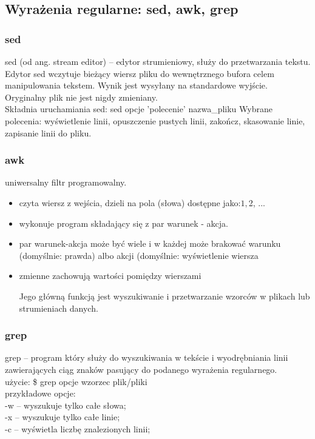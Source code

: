 \documentclass[a4paper,twoside]{report}
\begin{document}
\subsection{Wyrażenia regularne: sed, awk, grep} 

\subsubsection{sed}

sed (od ang. stream editor) – edytor strumieniowy, służy do przetwarzania tekstu.
Edytor sed
wczytuje   bieżący   wiersz   pliku   do   wewnętrznego   bufora   celem
manipulowania   tekstem.   Wynik   jest   wysyłany   na   standardowe   wyjście.
Oryginalny plik nie jest nigdy zmieniany. 
\\
Składnia uruchamiania sed: sed 
opcje 'polecenie' nazwa\_pliku
Wybrane polecenia: wyświetlenie linii, opuszczenie pustych linii, zakończ, skasowanie linie, zapisanie linii do pliku.

\subsubsection{awk}

uniwersalny filtr programowalny. 
\begin{itemize}
	\item czyta wiersz z wejścia, dzieli na pola (słowa) dostępne jako:$1, $2, ...
	\item wykonuje program składający się z par warunek - akcja.
	\item par warunek-akcja może być wiele i w każdej może brakować warunku
	(domyślnie: prawda) albo akcji (domyślnie: wyświetlenie wiersza
	\item zmienne zachowują wartości pomiędzy wierszami
	
	Jego główną funkcją jest wyszukiwanie i przetwarzanie wzorców w plikach lub strumieniach danych.
\end{itemize} 

\subsubsection{grep}

grep – program który służy do wyszukiwania w tekście i wyodrębniania linii zawierających ciąg znaków pasujący do podanego wyrażenia regularnego.\\

użycie: \$ grep opcje wzorzec plik/pliki\\
przykładowe opcje: \\
-w – wyszukuje tylko całe słowa;\\
-x – wyszukuje tylko całe linie;\\
-c –  wyświetla liczbę znalezionych linii;
\end{document}
